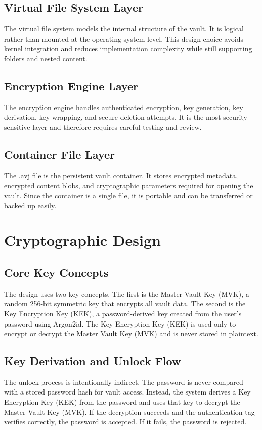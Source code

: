 \documentclass[12pt,a4paper]{report}
\newcommand{\mvk}{Master Vault Key (MVK)}
\newcommand{\kek}{Key Encryption Key (KEK)}
\begin{document}
\section{Virtual File System Layer}
The virtual file system models the internal structure of the vault. It is logical rather than mounted at the operating system level. This design choice avoids kernel integration and reduces implementation complexity while still supporting folders and nested content.

\section{Encryption Engine Layer}
The encryption engine handles authenticated encryption, key generation, key derivation, key wrapping, and secure deletion attempts. It is the most security-sensitive layer and therefore requires careful testing and review.

\section{Container File Layer}
The .avj file is the persistent vault container. It stores encrypted metadata, encrypted content blobs, and cryptographic parameters required for opening the vault. Since the container is a single file, it is portable and can be transferred or backed up easily.

\chapter{Cryptographic Design}
\section{Core Key Concepts}
The design uses two key concepts. The first is the \mvk{}, a random 256-bit symmetric key that encrypts all vault data. The second is the \kek{}, a password-derived key created from the user's password using Argon2id. The \kek{} is used only to encrypt or decrypt the \mvk{} and is never stored in plaintext.

\section{Key Derivation and Unlock Flow}
The unlock process is intentionally indirect. The password is never compared with a stored password hash for vault access. Instead, the system derives a \kek{} from the password and uses that key to decrypt the \mvk{}. If the decryption succeeds and the authentication tag verifies correctly, the password is accepted. If it fails, the password is rejected.
\end{document}
